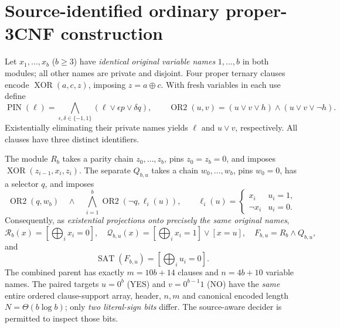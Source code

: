 \documentclass[11pt]{article}
\newcommand{\SAT}{\operatorname{SAT}}
\begin{document}
\section{Source-identified ordinary proper-3CNF construction}
Let $x_1,\ldots,x_b$ ($b\ge3$) have \emph{identical original
variable names} $1,\ldots,b$ in both modules; all other names are
private and disjoint. Four proper ternary clauses encode
$\operatorname{XOR}(a,c,z)$, imposing $z=a\oplus c$.
With fresh variables in each use define
\[
 \operatorname{PIN}(\ell)=
  \bigwedge_{\epsilon,\delta\in\{-1,1\}}
  (\ell\vee\epsilon p\vee\delta q),\qquad
 \operatorname{OR2}(u,v)=(u\vee v\vee h)\wedge(u\vee v\vee\neg h).
\]
Existentially eliminating their private names yields $\ell$ and
$u\vee v$, respectively. All clauses have three distinct identifiers.

The module $R_b$ takes a parity chain $z_0,\ldots,z_b$,
pins $z_0=z_b=0$, and imposes
$\operatorname{XOR}(z_{i-1},x_i,z_i)$.
The separate $Q_{b,u}$ takes a chain $w_0,\ldots,w_b$, pins $w_0=0$,
has a selector $q$, and imposes
\[
 \operatorname{OR2}(q,w_b)\quad\wedge\quad
 \bigwedge_{i=1}^b\operatorname{OR2}(\neg q,\ell_i(u)),
 \qquad
 \ell_i(u)=\begin{cases}x_i&u_i=1,\\\neg x_i&u_i=0.\end{cases}
\]
Consequently, as \emph{existential projections onto precisely the
same original names},
\[
 \mathcal R_b(x)=[\bigoplus_i x_i=0],\quad
 \mathcal Q_{b,u}(x)=[\bigoplus_i x_i=1]\vee[x=u],
 \quad F_{b,u}=R_b\wedge Q_{b,u},
\]
and
\[
 \SAT(F_{b,u})=[\bigoplus_i u_i=0].
 \tag{1}
\]
The combined parent has exactly $m=10b+14$ clauses and
$n=4b+10$ variable names. The paired targets $u=0^b$
(YES) and $v=0^{b-1}1$ (NO) have the \emph{same}
entire ordered clause-support array, header, $n,m$ and canonical
encoded length $N=\Theta(b\log b)$; only \emph{two literal-sign bits}
differ. The source-aware decider is permitted to inspect those bits.
\end{document}
